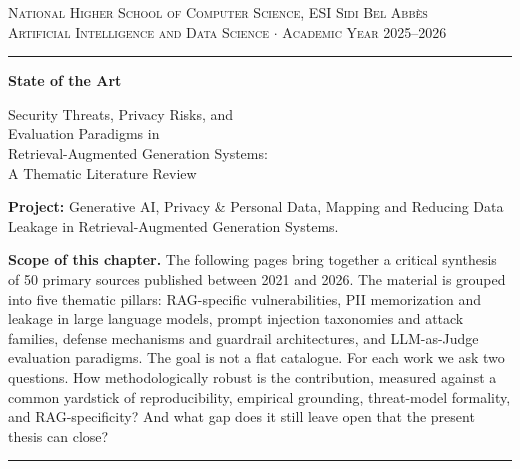 \documentclass[12pt, a4paper]{article}
\begin{document}

\begin{titlepage}
\begin{center}
\vspace*{1.2cm}
{\small\color{navy!80}\textsc{National Higher School of Computer Science, ESI Sidi Bel Abb\`{e}s}}\\[0.15cm]
{\small\color{navy!80}\textsc{Artificial Intelligence and Data Science $\cdot$ Academic Year 2025--2026}}
\vspace{0.5cm}
{\color{navy}\rule{\textwidth}{1.2pt}}
\vspace{1.6cm}

{\color{navy}\Huge\bfseries State of the Art}

\vspace{0.5cm}
{\color{navy!85}\LARGE Security Threats, Privacy Risks, and\\[0.15cm] Evaluation Paradigms in\\[0.15cm] Retrieval-Augmented Generation Systems:\\[0.15cm] A Thematic Literature Review}

\vspace{2cm}
\begin{prosebox}
{\small\textbf{Project:} Generative AI, Privacy \& Personal Data, Mapping and Reducing Data Leakage in Retrieval-Augmented Generation Systems.

\medskip
\textbf{Scope of this chapter.} The following pages bring together a critical synthesis of 50 primary sources published between 2021 and 2026. The material is grouped into five thematic pillars: RAG-specific vulnerabilities, PII memorization and leakage in large language models, prompt injection taxonomies and attack families, defense mechanisms and guardrail architectures, and LLM-as-Judge evaluation paradigms. The goal is not a flat catalogue. For each work we ask two questions. How methodologically robust is the contribution, measured against a common yardstick of reproducibility, empirical grounding, threat-model formality, and RAG-specificity? And what gap does it still leave open that the present thesis can close?}
\end{prosebox}
\vfill
{\color{navy}\rule{\textwidth}{1.2pt}}
\end{center}
\end{titlepage}

\newpage
\tableofcontents
\newpage

\end{document}
